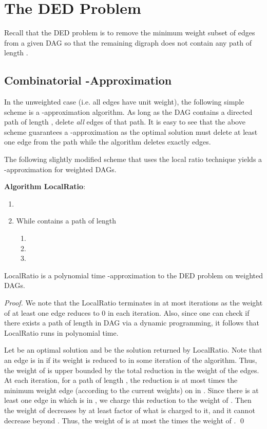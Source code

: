\documentclass[oribibl]{llncs}
\newcommand{\mink}{{\sc DED}\xspace}
\begin{document}
\section{The \mink Problem}
\label{sec:mink}

Recall that the \mink problem is to remove the minimum weight subset 
of edges from a given DAG
so that the remaining digraph
does not contain any path of length . 

\subsection{Combinatorial -Approximation}
\label{sec:greedy-k-appr}

In the unweighted case (i.e. all edges have unit weight), 
the following simple
scheme is a -approximation algorithm. As long as the DAG
contains a directed path   of length , delete \emph{all} edges
of that path. It is easy to see that the above scheme guarantees a
-approximation as the optimal solution must delete at least one
edge from the path  while the algorithm deletes exactly  edges.

The following slightly modified scheme that uses the 
local ratio technique yields a -approximation for weighted DAGs.

\vspace{2mm}
{\bf Algorithm {\sf LocalRatio}}:
\vspace{-2mm}
\begin{enumerate}
\item 
\item While  contains a path  of length 
  \begin{enumerate}
  \item 
  \item 
  \item 
  \end{enumerate}
\end{enumerate}

\begin{theorem}
	{\sf LocalRatio} 
	is a polynomial time -approximation to the 
	\mink problem on weighted DAGs. 
\end{theorem}
\begin{proof}
	We note that the {\sf LocalRatio} 
	terminates in at most  iterations as
the weight of at least one edge reduces to 0 in each iteration. Also,
since one can check if there exists a path of length  in DAG via a
dynamic programming, it follows that {\sf LocalRatio} runs in polynomial
time.

Let  be an optimal solution and  be the
solution returned by {\sf LocalRatio}.
Note that an edge is in  if its
weight is reduced to  in some iteration of the algorithm. 
Thus, the weight of  is upper
bounded by the total reduction in the weight of the edges. 
At each iteration, for a path  of
length , the reduction is at most
 times the minimum weight edge (according to the current weights)
on in . Since there is at least one edge  in  which is in
, we charge this reduction to the weight of . Then
the weight of  decreases by at least  factor of what is charged to
it, and it cannot decrease beyond . Thus, the weight of  is
at most the  times the weight of . \qed
\end{proof}
\end{document}
